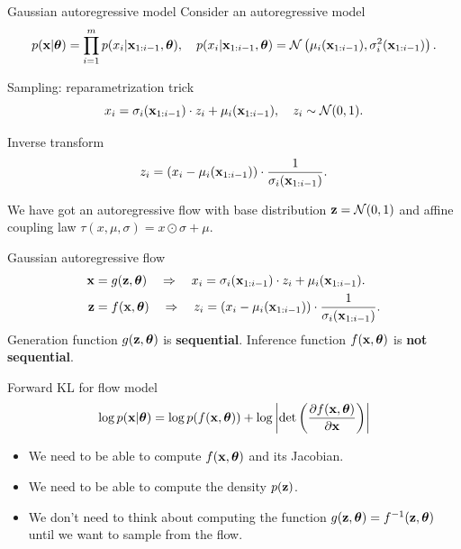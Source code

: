 \begin{frame}{Gaussian autoregressive model}
	Consider an autoregressive model
	\vspace{-0.3cm}
	{\small
	\[
		p(\mathbf{x} | \boldsymbol{\theta}) = \prod_{i=1}^m p(x_i | \mathbf{x}_{1:i - 1}, \boldsymbol{\theta}), \quad
		p(x_i | \mathbf{x}_{1:i - 1}, \boldsymbol{\theta}) = \mathcal{N} \left(\mu_i(\mathbf{x}_{1:i-1}), \sigma^2_i (\mathbf{x}_{1:i-1})\right).
	\]
	}
	\vspace{-0.5cm}
	\begin{block}{Sampling: reparametrization trick}
		\[
		x_i = \sigma_i (\mathbf{x}_{1:i-1}) \cdot z_i + \mu_i(\mathbf{x}_{1:i-1}), \quad z_i \sim \mathcal{N}(0, 1).
		\]
	\end{block}
	\begin{block}{Inverse transform}
		\vspace{-0.3cm}
		\[
		z_i = \left(x_i - \mu_i(\mathbf{x}_{1:i-1}) \right) \cdot \frac{1}{\sigma_i (\mathbf{x}_{1:i-1}) }.
		\]
		\vspace{-0.3cm}
	\end{block}
	We have got an autoregressive flow with base distribution $\mathbf{z} = \mathcal{N}(0, 1)$ and affine coupling law $\tau(x, \mu, \sigma) = x \odot \sigma + \mu$.
\end{frame}
\begin{frame}{Gaussian autoregressive flow}
	\vspace{-0.2cm}
	\begin{align*}
		\mathbf{x} &= g(\mathbf{z}, \boldsymbol{\theta}) \quad \Rightarrow \quad x_i = \sigma_i (\mathbf{x}_{1:i-1}) \cdot z_i + \mu_i(\mathbf{x}_{1:i-1}). \\
		\mathbf{z} &= f(\mathbf{x}, \boldsymbol{\theta}) \quad \Rightarrow \quad z_i = \left(x_i - \mu_i(\mathbf{x}_{1:i-1}) \right) \cdot \frac{1}{ \sigma_i (\mathbf{x}_{1:i-1})}.
	\end{align*}
	Generation function $g(\mathbf{z}, \boldsymbol{\theta})$ is \textbf{sequential}. Inference function $f(\mathbf{x}, \boldsymbol{\theta})$ is \textbf{not sequential}.
	\begin{block}{Forward KL for flow model}
		\vspace{-0.2cm}
		\[
		\log p(\mathbf{x}|\boldsymbol{\theta}) = \log p(f(\mathbf{x}, \boldsymbol{\theta})) + \log  \left|\det \left( \frac{\partial f(\mathbf{x}, \boldsymbol{\theta})}{\partial \mathbf{x}} \right) \right|
		\]
		\vspace{-0.2cm}
		\begin{itemize}
			\item We need to be able to compute $f(\mathbf{x}, \boldsymbol{\theta})$ and its Jacobian.
			\item We need to be able to compute the density $p(\mathbf{z})$.
			\item We don’t need to think about computing the function $g(\mathbf{z}, \boldsymbol{\theta}) = f^{-1}(\mathbf{z}, \boldsymbol{\theta})$ until we want to sample from the flow.
		\end{itemize}
	\end{block}
\end{frame}
